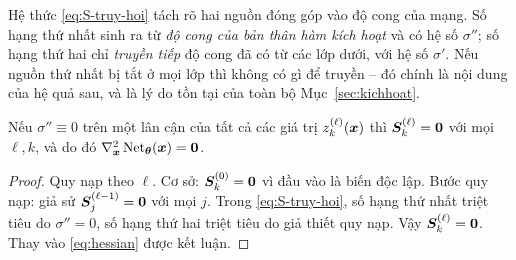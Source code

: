 Hệ thức \eqref{eq:S-truy-hoi} tách rõ hai nguồn đóng góp vào độ cong của mạng.
Số hạng thứ nhất sinh ra từ \emph{độ cong của bản thân hàm kích hoạt} và có hệ
số $\sigma''$; số hạng thứ hai chỉ \emph{truyền tiếp} độ cong đã có từ các lớp
dưới, với hệ số $\sigma'$. Nếu nguồn thứ nhất bị tắt ở mọi lớp thì không có gì
để truyền -- đó chính là nội dung của hệ quả sau, và là lý do tồn tại của toàn
bộ Mục~\ref{sec:kichhoat}.
 
\begin{hequa}
\label{hq:relu-hessian}
Nếu $\sigma'' \equiv 0$ trên một lân cận của tất cả các giá trị
$z^{(\ell)}_k(\bm{x})$ thì $\bm{S}^{(\ell)}_k = \bm{0}$ với mọi $\ell, k$, và do đó
$\nabla^2_{\bm{x}}\operatorname{Net}_{\bm{\theta}}(\bm{x}) = \bm{0}$.
\end{hequa}
 
\begin{proof}
Quy nạp theo $\ell$. Cơ sở: $\bm{S}^{(0)}_k = \bm{0}$ vì đầu vào là biến độc lập.
Bước quy nạp: giả sử $\bm{S}^{(\ell-1)}_j = \bm{0}$ với mọi $j$. Trong
\eqref{eq:S-truy-hoi}, số hạng thứ nhất triệt tiêu do $\sigma'' = 0$, số hạng
thứ hai triệt tiêu do giả thiết quy nạp. Vậy $\bm{S}^{(\ell)}_k = \bm{0}$. Thay vào
\eqref{eq:hessian} được kết luận.
\end{proof}
 
